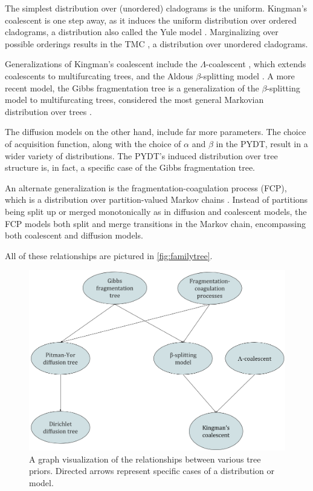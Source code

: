 \documentclass{article}
\begin{document}
The simplest distribution over (unordered) cladograms
is the uniform.
Kingman's coalescent is one step away,
as it
induces the uniform distribution
over ordered cladograms,
a distribution also called
the Yule model \citep{Harding1971}.
Marginalizing over possible orderings
results in the TMC \citep{Boyles2012}, a distribution over unordered cladograms.

Generalizations of Kingman's coalescent
include the $\Lambda$-coalescent \citep{Pitman1999},
which extends coalescents to multifurcating trees,
and the Aldous $\beta$-splitting model \citep{Aldous1996}.
A more recent model, the Gibbs fragmentation tree
is a generalization of the $\beta$-splitting model
to multifurcating trees,
considered the most general Markovian distribution over trees \citep{McCullagh2008}.

The diffusion models on the other hand,
include far more parameters.
The choice of acquisition function,
along with the choice of $\alpha$ and $\beta$ in the PYDT,
result in a wider variety of distributions.
The PYDT's induced distribution over tree
structure is, in fact, a specific case
of the Gibbs fragmentation tree.

An alternate generalization is the fragmentation-coagulation process (FCP),
which is a distribution over partition-valued
Markov chains \citep{Teh2011}.
Instead of partitions being
split up or merged monotonically as in
diffusion and coalescent models, the 
FCP models both split and merge
transitions in the Markov chain, encompassing
both coalescent and diffusion models.

All of these relationships are pictured in \autoref{fig:familytree}.

\begin{figure}[H]
  \includegraphics[width=\textwidth]{img/FamilyTree}
  \caption{A graph visualization of the relationships between various
  tree priors. Directed arrows represent
  specific cases of a distribution or model.}
\label{fig:familytree}
\end{figure}
\end{document}
